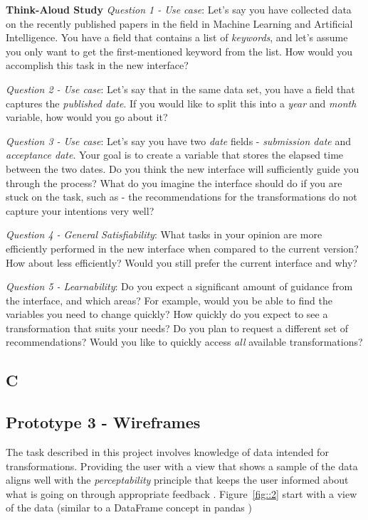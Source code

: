 \documentclass[12pt,letterpaper]{article}
\begin{document}
\textbf{Think-Aloud Study}
\textit{Question 1 - Use case}: Let's say you have collected data on the recently published papers in the field in Machine Learning and Artificial Intelligence. You have a field that contains a list of \textit{keywords}, and let's assume you only want to get the first-mentioned keyword from the list. How would you accomplish this task in the new interface?  

\textit{Question 2 - Use case}: Let's say that in the same data set, you have a field that captures the \textit{published date}. If you would like to split this into a \textit{year} and \textit{month} variable, how would you go about it?

\textit{Question 3 - Use case}: Let's say you have two \textit{date} fields - \textit{submission date} and \textit{acceptance date}. Your goal is to create a variable that stores the elapsed time between the two dates. Do you think the new interface will sufficiently guide you through the process? What do you imagine the interface should do if you are stuck on the task, such as - the recommendations for the transformations do not capture your intentions very well?   

\textit{Question 4 - General Satisfiability}: What tasks in your opinion are more efficiently performed in the new interface when compared to the current version? How about less efficiently? Would you still prefer the current interface and why? 

\textit{Question 5 - Learnability}: Do you expect a significant amount of guidance from the interface, and which areas? For example, would you be able to find the variables you need to change quickly? How quickly do you expect to see a transformation that suits your needs? Do you plan to request a different set of recommendations? Would you like to quickly access \textit{all} available transformations? 

\subsection*{C}

\subsection*{Prototype 3 - Wireframes}
The task described in this project involves knowledge of data intended for transformations. Providing the user with a view that shows a sample of the data aligns well with the \textit{perceptability} principle that keeps the user informed about what is going on through appropriate feedback \cite{nielsen1994usability}. Figure~\ref{fig::2} start with a view of the data (similar to a DataFrame concept in pandas \cite{mckinney2011pandas})
\end{document}
